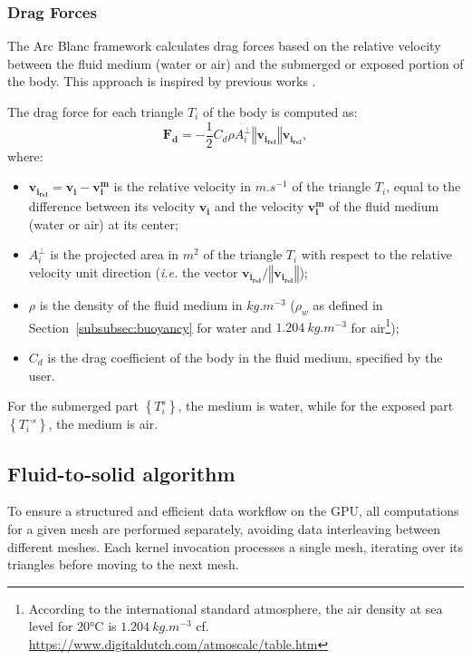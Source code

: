 \documentclass[11pt]{article}
\def\Framework{The Arc Blanc framework\xspace}
\def\ie{\emph{i.e.}\xspace}
\begin{document}
\subsubsection{Drag Forces}
\label{subsubsec:dragForce}
\Framework calculates drag forces based on the relative velocity between the fluid medium (water or air) and the submerged or exposed portion of the body. This approach is inspired by previous works \cite{yukselRealtimeWaterWaves2010,kellomakiRigidBodyInteraction2014,kernerWaterInteractionModel2016}.

The drag force for each triangle $T_i$ of the body is computed as:
\begin{equation}
	\mathbf{F_d}= -\frac{1}{2} C_d \rho A_i^{\perp} \left\Vert\mathbf{v_{i_{rel}}}\right\Vert\mathbf{v_{i_{rel}}},
\end{equation}
where:
\begin{itemize}
	\item $\mathbf{v_{i_{rel}}}=\mathbf{v_i}-\mathbf{v_{i}^{m}}$ is the relative velocity in $m.s^{-1}$ of the triangle $T_i$, equal to the difference between its velocity $\mathbf{v_i}$ and the velocity $\mathbf{v_{i}^{m}}$ of the fluid medium (water or air) at its center;
	\item $A_i^{\perp}$ is the projected area in $m^2$ of the triangle $T_i$ with respect to the relative velocity unit direction (\ie the vector $\mathbf{v_{i_{rel}}}/\left\Vert\mathbf{v_{i_{rel}}}\right\Vert$);
	\item $\rho$ is the density of the fluid medium in $kg.m^{-3}$ ($\rho_w$ as defined in Section~\ref{subsubsec:buoyancy} for water and $1.204~kg.m^{-3}$  for air\footnote{According to the international standard atmosphere, the air density at sea level for $20$°C is $1.204~kg.m^{-3}$ cf. \url{https://www.digitaldutch.com/atmoscalc/table.htm}});
	\item $C_d$ is the drag coefficient of the body in the fluid medium, specified by the user.
\end{itemize}

For the submerged part $\left\lbrace T_i^s\right\rbrace$, the medium is water, while for the exposed part $\left\lbrace T_i^{\neg s}\right\rbrace$, the medium is air.


\subsection{Fluid-to-solid algorithm}
\label{subsec:algoForces}


To ensure a structured and efficient data workflow on the GPU, all computations for a given mesh are performed separately, avoiding data interleaving between different meshes. Each kernel invocation processes a single mesh, iterating over its triangles before moving to the next mesh.
\end{document}
